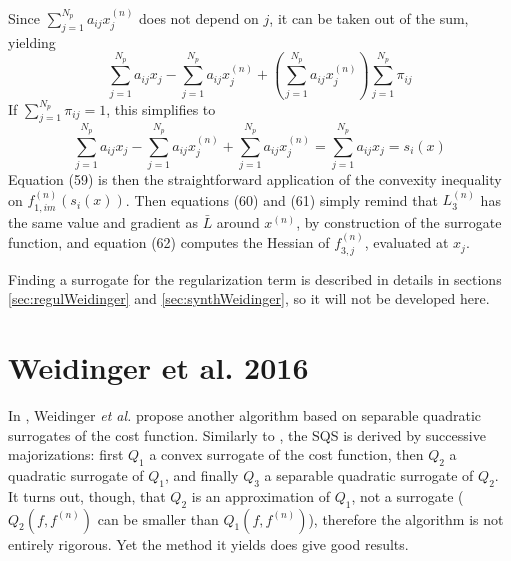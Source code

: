\documentclass[a4paper, 10pt]{article}
\begin{document}
Since $\sum_{j=1}^{N_p} a_{ij} x_j^{(n)}$ does not depend on $j$, it can be taken out of the sum, yielding
\begin{equation*}
 \sum_{j=1}^{N_p} a_{ij} x_j - \sum_{j=1}^{N_p} a_{ij} x_j^{(n)} + \left( \sum_{j=1}^{N_p} a_{ij} x_j^{(n)} \right) \sum_{j=1}^{N_p} \pi_{ij}
\end{equation*}
If $\sum_{j=1}^{N_p} \pi_{ij} = 1$, this simplifies to 
\begin{equation*}
  \sum_{j=1}^{N_p} a_{ij} x_j - \sum_{j=1}^{N_p} a_{ij} x_j^{(n)} + \sum_{j=1}^{N_p} a_{ij} x_j^{(n)} = \sum_{j=1}^{N_p} a_{ij} x_j = s_i(x)
\end{equation*}
Equation (59) is then the straightforward application of the convexity inequality on $f_{1, im}^{(n)} (s_i(x))$. Then equations (60) and (61) simply
remind that $L_3^{(n)}$ has the same value and gradient as $\bar{L}$ around $x^{(n)}$, by construction of the surrogate function, and equation (62) computes
the Hessian of $f_{3,j}^{(n)}$, evaluated at $x_j$.

Finding a surrogate for the regularization term is described in details in sections \ref{sec:regulWeidinger} and \ref{sec:synthWeidinger}, so it will not be developed here.

\section{Weidinger et al. 2016}
In \cite{weidinger_polychromatic_2016}, Weidinger \textit{et al.} propose another algorithm based on separable quadratic surrogates of the cost function. Similarly to \cite{long_multi-material_2014}, 
the SQS is derived by successive majorizations: first $Q_1$ a convex surrogate of the cost function, then $Q_2$ a quadratic surrogate of $Q_1$, and finally $Q_3$ a separable quadratic surrogate of $Q_2$.
It turns out, though, that $Q_2$ is an approximation of $Q_1$, not a surrogate ($Q_2(f, f^{(n)})$ can be smaller than $Q_1(f, f^{(n)})$), therefore the algorithm is not entirely rigorous. Yet the method
it yields does give good results. 
\end{document}
